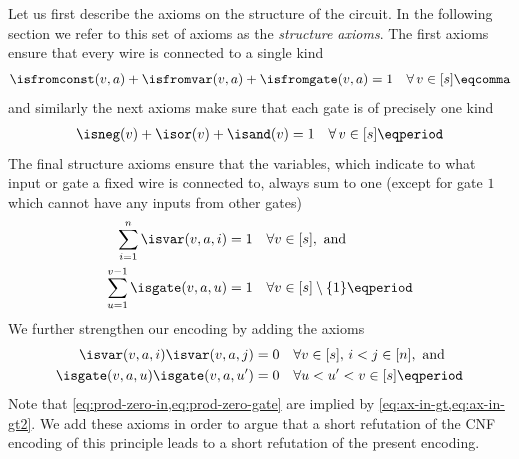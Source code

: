 Let us first describe
the axioms on the structure of the circuit. In the following
section we refer to this set of axioms as the \emph{structure
  axioms}. The first axioms ensure that every wire is connected to a
single kind
\begin{align}
  \label{eq:ax-from}
  \isfromconst(v, a) +
  \isfromvar(v, a) +
  \isfromgate(v, a) = 1 \quad
  \forall \, v \in [s] \eqcomma
\end{align}
and similarly the next axioms make sure that each gate is of
precisely one kind
\begin{align}
  \label{eq:ax-fn}
  \isneg(v) + \isor(v) + \isand(v) = 1
  \quad \forall \, v \in [s] \eqperiod
\end{align}
The final structure axioms ensure that the variables, which indicate
to what input or gate a fixed wire is connected to, always sum to one
(except for gate $1$ which cannot have any inputs from other gates)
\begin{align}
  \label{eq:ax-in-gt}
  \sum_{i = 1}^{n}\isvar(v,a,i) &= 1
  \quad \forall v \in [s], \text{ and}\\
  \label{eq:ax-in-gt2}
  \sum_{u = 1}^{v-1}\isgate(v,a,u) &= 1
  \quad \forall v \in [s] \setminus\{1\} \eqperiod
\end{align}
We further strengthen our encoding by adding the axioms
\begin{align}
  \label{eq:prod-zero-in}
  \isvar(v,a,i)\isvar(v,a,j) &= 0
  \quad\forall v \in [s],\, i < j \in [n], \text{ and}\\
  \label{eq:prod-zero-gate}
  \isgate(v,a,u)\isgate(v,a,u') &= 0
  \quad\forall u < u' < v \in [s] \eqperiod
\end{align}
Note that \cref{eq:prod-zero-in,eq:prod-zero-gate} are implied by
\cref{eq:ax-in-gt,eq:ax-in-gt2}. We add these axioms in order to argue
that a short refutation of the CNF encoding of this principle leads to
a short refutation of the present encoding.

